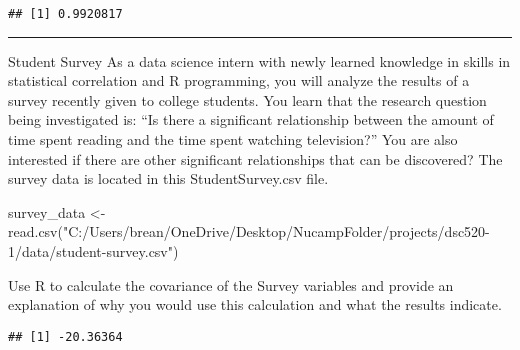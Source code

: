 \documentclass[
]{article}
\newenvironment{Shaded}{\begin{snugshade}}{\end{snugshade}}
\newcommand{\FunctionTok}[1]{\textcolor[rgb]{0.00,0.00,0.00}{#1}}
\newcommand{\NormalTok}[1]{#1}
\newcommand{\OtherTok}[1]{\textcolor[rgb]{0.56,0.35,0.01}{#1}}
\newcommand{\SpecialCharTok}[1]{\textcolor[rgb]{0.00,0.00,0.00}{#1}}
\newcommand{\StringTok}[1]{\textcolor[rgb]{0.31,0.60,0.02}{#1}}
\begin{document}
\begin{verbatim}
## [1] 0.9920817
\end{verbatim}

\begin{center}\rule{0.5\linewidth}{0.5pt}\end{center}

Student Survey As a data science intern with newly learned knowledge in
skills in statistical correlation and R programming, you will analyze
the results of a survey recently given to college students. You learn
that the research question being investigated is: ``Is there a
significant relationship between the amount of time spent reading and
the time spent watching television?'' You are also interested if there
are other significant relationships that can be discovered? The survey
data is located in this StudentSurvey.csv file.

\begin{Shaded}
\begin{Highlighting}[]
\NormalTok{survey\_data }\OtherTok{\textless{}{-}} \FunctionTok{read.csv}\NormalTok{(}\StringTok{"C:/Users/brean/OneDrive/Desktop/NucampFolder/projects/dsc520{-}1/data/student{-}survey.csv"}\NormalTok{)}
\end{Highlighting}
\end{Shaded}

Use R to calculate the covariance of the Survey variables and provide an
explanation of why you would use this calculation and what the results
indicate.

\begin{Shaded}
\end{Shaded}

\begin{verbatim}
## [1] -20.36364
\end{verbatim}

\begin{Shaded}
\end{Shaded}
\end{document}
